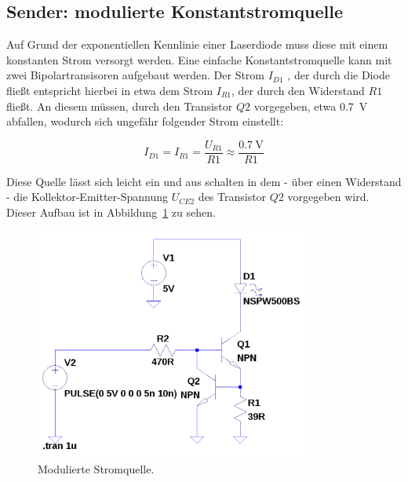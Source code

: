 \documentclass[12pt,a4paper]{article}
\begin{document}
\subsection{Sender: modulierte Konstantstromquelle}
\label{sec:direct_tx}
Auf Grund der exponentiellen Kennlinie einer Laserdiode muss diese mit einem konstanten Strom versorgt werden. Eine einfache Konstantstromquelle kann mit zwei Bipolartransisoren aufgebaut werden. Der Strom $I_{D1}$ , der durch die Diode fließt entspricht hierbei in etwa dem Strom $I_{R1}$, der durch den Widerstand $R1$ fließt. An diesem müssen, durch den Transistor  $Q2$ vorgegeben, etwa \SI{0.7}{\volt} abfallen, wodurch sich ungefähr folgender Strom einstellt:

\begin{equation}
I_{D1} = I_{R1} = \frac{U_{R1}}{R1} \approx \frac{\SI{0.7}{\volt}}{R1}
\end{equation}

Diese Quelle lässt sich leicht ein und aus schalten in dem - über einen Widerstand - die Kollektor-Emitter-Spannung $U_{CE2}$ des Transistor $Q2$ vorgegeben wird. Dieser Aufbau ist in Abbildung~\ref{fig:modulated_current_source} zu sehen.

\begin{figure}[!h]
  \centering
    \includegraphics[width=0.8\textwidth]{../spice/modulated_current_source.png}
  \caption{Modulierte Stromquelle.}
  \label{fig:modulated_current_source}
\end{figure}
\end{document}
